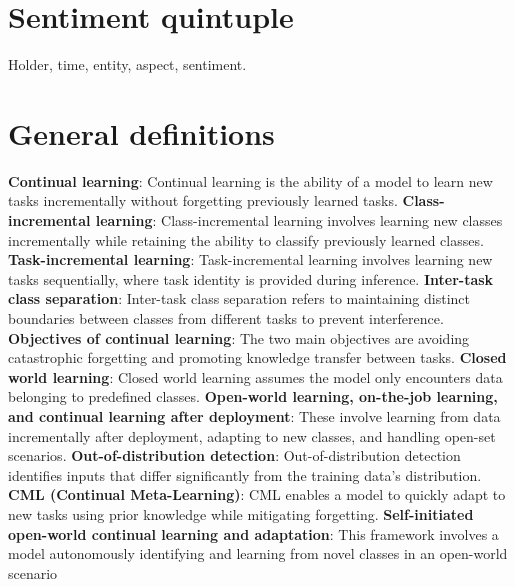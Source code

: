 \documentclass[10pt,oneside,a4paper]{article}
\begin{document}
\section{Sentiment quintuple}
Holder, time, entity, aspect, sentiment.


\section{General definitions}
\textbf{Continual learning}: Continual learning is the ability of a model to learn new tasks incrementally without forgetting previously
learned tasks.
\textbf{Class-incremental learning}: Class-incremental learning involves learning new classes incrementally while retaining the ability to
classify previously learned classes.
\textbf{Task-incremental learning}: Task-incremental learning involves learning new tasks sequentially, where task identity is provided
during inference.
\textbf{Inter-task class separation}: Inter-task class separation refers to maintaining distinct boundaries between classes from different
tasks to prevent interference.
\textbf{Objectives of continual learning}: The two main objectives are avoiding catastrophic forgetting and promoting knowledge
transfer between tasks.
\textbf{Closed world learning}: Closed world learning assumes the model only encounters data belonging to predefined classes.
\textbf{Open-world learning, on-the-job learning, and continual learning after deployment}: These involve learning from data
incrementally after deployment, adapting to new classes, and handling open-set scenarios.
\textbf{Out-of-distribution detection}: Out-of-distribution detection identifies inputs that differ significantly from the training data's
distribution.
\textbf{CML (Continual Meta-Learning)}: CML enables a model to quickly adapt to new tasks using prior knowledge while mitigating
forgetting.
\textbf{Self-initiated open-world continual learning and adaptation}: This framework involves a model autonomously identifying and
learning from novel classes in an open-world scenario
\end{document}
